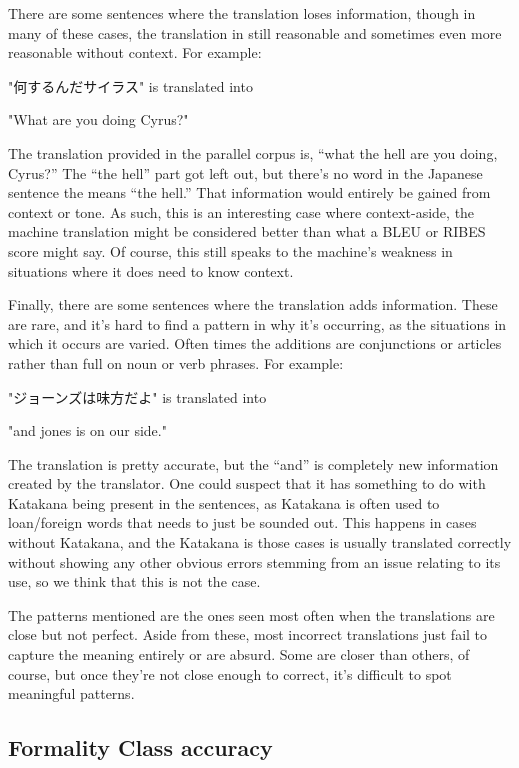 \documentclass[11pt]{article}
\begin{document}
There are some sentences where the translation loses information, though in many of these cases, the translation in still reasonable and sometimes even more reasonable without context. For example:

"何するんだサイラス" is translated into

"What are you doing Cyrus?"

The translation provided in the parallel corpus is, “what the hell are you doing, Cyrus?” The “the hell” part got left out, but there’s no word in the Japanese sentence the means “the hell.” That information would entirely be gained from context or tone. As such, this is an interesting case where context-aside, the machine translation might be considered better than what a BLEU or RIBES score might say. Of course, this still speaks to the machine’s weakness in situations where it does need to know context.

Finally, there are some sentences where the translation adds information. These are rare, and it’s hard to find a pattern in why it’s occurring, as the situations in which it occurs are varied. Often times the additions are conjunctions or articles rather than full on noun or verb phrases. For example: 

"ジョーンズは味方だよ" is translated into

"and jones is on our side."

The translation is pretty accurate, but the “and” is completely new information created by the translator. One could suspect that it has something to do with Katakana being present in the sentences, as Katakana is often used to loan/foreign words that needs to just be sounded out. This happens in cases without Katakana, and the Katakana is those cases is usually translated correctly without showing any other obvious errors stemming from an issue relating to its use, so we think that this is not the case. 

The patterns mentioned are the ones seen most often when the translations are close but not perfect. Aside from these, most incorrect translations just fail to capture the meaning entirely or are absurd. Some are closer than others, of course, but once they’re not close enough to correct, it’s difficult to spot meaningful patterns.

\subsection{Formality Class accuracy}
\end{document}
